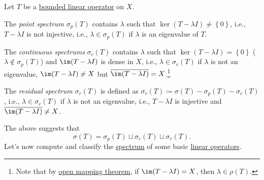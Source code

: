 \begin{definition*}
	Let \(T\) be a \hyperref[def:bounded-linear-op]{bounded linear operator} on \(X\).
	\begin{definition}\label{def:point-spectrum}
		The \emph{point spectrum} \(\sigma _p(T)\) contains \(\lambda \) such that \(\ker(T - \lambda I) \neq \left\{ 0 \right\} \), i.e., \(T - \lambda I\) is not injective, i.e., \(\lambda \in \sigma _p(T)\) if \(\lambda \) is an eigenvalue of \(T\).
	\end{definition}
	\begin{definition}\label{def:continuous-spectrum}
		The \emph{continuous spectrums} \(\sigma _c(T)\) contains \(\lambda \) such that \(\ker(T - \lambda I) = \left\{ 0 \right\} \) (\(\lambda \notin \sigma _p(T)\)) and \(\im(T-\lambda I)\) is dense in \(X\), i.e., \(\lambda \in \sigma _c(T)\) if \(\lambda \) is not an eigenvalue, \(\im(T-\lambda I)\neq X\) but \(\overline{\im(T-\lambda I)}=X\).\footnote{Note that by \hyperref[thm:open-mapping]{open mapping theorem}, if \(\im(T - \lambda I)=X\), then \(\lambda \in \rho (T)\).}
	\end{definition}
	\begin{definition}\label{def:residual-spectrum}
		The \emph{residual spectrum} \(\sigma _r(T)\) is defined as \(\sigma _r(T)\coloneqq \sigma (T) - \sigma _p(T) - \sigma _c(T)\), i.e., \(\lambda \in \sigma _r(T)\) if \(\lambda \) is not an eigenvalue, i.e., \(T-\lambda I\) is injective and \(\overline{\im(T-\lambda I)}\neq X\).
	\end{definition}
\end{definition*}

The above suggests that
\[
	\sigma (T) = \sigma _p (T) \sqcup \sigma _c(T) \sqcup \sigma _r(T).
\]
Let's now compute and classify the \hyperref[def:spectrum-point]{spectrum} of some basic \hyperref[def:linear-op]{linear operators}.


